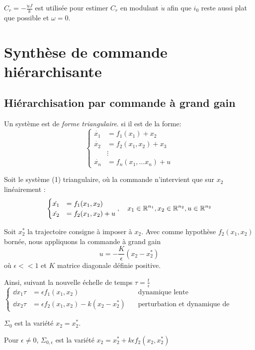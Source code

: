 \documentclass[main.tex]{subfiles}
\begin{document}
\begin{rem}
$C_r = -\frac{\dot{u}J}{k}$ est utilisée pour estimer $C_r$ en modulant $\dot{u}$ afin que $i_0$ reste aussi plat que possible et $\omega=0$.
\end{rem}
\section{Synthèse de commande hiérarchisante}

\subsection{Hiérarchisation par commande à grand gain}
\begin{defin}
  Un  système est de \emph{forme triangulaire}. si il est de la forme:
  \[
    \begin{cases}

\dot{x_1} & = f_1(x_1) + x_2 \\
\dot{x_2} & = f_2(x_1,x_2) + x_3 \\
& \vdots \\
\dot{x_n} & = f_n(x_1,\dots x_n) + u 
    \end{cases}
  \]
\end{defin}
Soit le système (1) triangulaire, où la commande n'intervient que sur $x_2$ linéairement :
\[
  \begin{cases}
    \dot{x_1} & = f_1(x_1,x_2)  \\
    \dot{x_2} & = f_2(x_1,x_2) + u \end{cases} , \quad x_1 \in \mathbb{R}^{n_1}, x_2 \in \mathbb{R}^{n_2}, u \in\mathbb{R}^{n_2}
\]

Soit $x_2^*$ la trajectoire consigne à imposer à $x_2$. Avec comme hypothèse $f_2(x_1,x_2)$ bornée, nous appliquons la commande à grand gain
\[ u = -\frac{K}{\epsilon}(x_2-x_2^*)\]
où $\epsilon<< 1$ et $K$ matrice diagonale définie positive.

Ainsi, suivant la nouvelle échelle de temps $\tau = \frac{t}{\epsilon}$
\[
\left\{    \begin{array}{rll}
\dd{x_1}{\tau} & = \epsilon f_1(x_1,x_2) &\quad \text{dynamique lente}\\
\dd{x_2}{\tau} & = \epsilon f_2(x_1,x_2) - k(x_2-x_2^*) &\quad \text{perturbation et dynamique de convergence rapide}
\end{array}\right.
\]

$\Sigma_0$ est la variété $x_2 = x_2^*$.

Pour $\epsilon\neq 0$, $\Sigma_{0,\epsilon}$ est la variété $x_2=x_2^*+k\epsilon f_2(x_2,x_2^*)$
\end{document}
